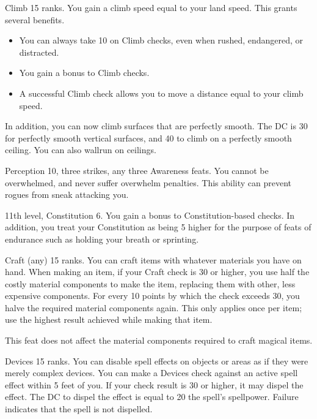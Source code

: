 \featpre Climb 15 ranks.
\featben You gain a climb speed equal to your land speed.
This grants several benefits.
\begin{itemize}
    \item You can always take 10 on Climb checks, even when rushed, endangered, or distracted.
    \item You gain a  bonus to Climb checks.
    \item A successful Climb check allows you to move a distance equal to your climb speed.
\end{itemize}

In addition, you can now climb surfaces that are perfectly smooth.
The DC is 30 for perfectly smooth vertical surfaces, and 40 to climb on a perfectly smooth ceiling.
You can also wallrun on ceilings.

\featpres Perception 10, three strikes, any three Awareness feats.
\featben You cannot be overwhelmed, and never suffer overwhelm penalties.
This ability can prevent rogues from sneak attacking you.

\featpres 11th level, Constitution 6.
\featben You gain a  bonus to Constitution-based checks.
In addition, you treat your Constitution as being 5 higher for the purpose of feats of endurance such as holding your breath or sprinting.

\featpre Craft (any) 15 ranks.
\featben You can craft items with whatever materials you have on hand.
When making an item, if your Craft check is 30 or higher, you use half the costly material components to make the item, replacing them with other, less expensive components.
For every 10 points by which the check exceeds 30, you halve the required material components again.
This only applies once per item; use the highest result achieved while making that item.

This feat does not affect the material components required to craft magical items.

\featpre Devices 15 ranks.
\featben You can disable spell effects on objects or areas as if they were merely complex devices.
You can make a Devices check against an active spell effect within 5 feet of you.
If your check result is 30 or higher, it may dispel the effect.
The DC to dispel the effect is equal to 20 \add the spell's spellpower.
Failure indicates that the spell is not dispelled.

